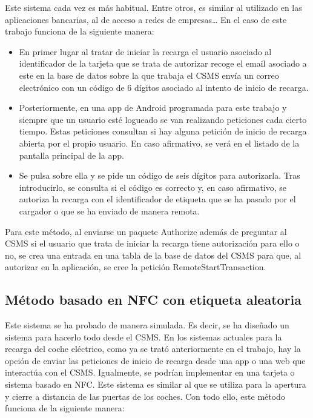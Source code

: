 \documentclass[12pt,a4paper,onecolumn,oneside]{report}
\begin{document}
Este sistema cada vez es más habitual. Entre otros, es similar al utilizado en las aplicaciones bancarias, al de acceso a redes de empresas… En el caso de este trabajo funciona de la siguiente manera:

\begin{itemize}
\item En primer lugar al tratar de iniciar la recarga el usuario asociado al identificador de la tarjeta que se trata de autorizar recoge el email asociado a este en la base de datos sobre la que trabaja el CSMS envía un correo electrónico con un código de 6 dígitos asociado al intento de inicio de recarga.
\item Posteriormente, en una app de Android programada para este trabajo y siempre que un usuario esté logueado se van realizando peticiones cada cierto tiempo. Estas peticiones consultan si hay alguna petición de inicio de recarga abierta por el propio usuario. En caso afirmativo, se verá en el listado de la pantalla principal de la app. 
\item Se pulsa sobre ella y se pide un código de seis dígitos para autorizarla. Tras introducirlo, se consulta si el código es correcto y, en caso afirmativo, se autoriza la recarga con el identificador de etiqueta que se ha pasado por el cargador o que se ha enviado de manera remota.
\end{itemize}

Para este método, al enviarse un paquete Authorize además de preguntar al CSMS si el usuario que trata de iniciar la recarga tiene autorización para ello o no, se crea una entrada en una tabla de la base de datos del CSMS para que, al autorizar en la aplicación, se cree la petición RemoteStartTransaction.


\subsection{Método basado en NFC con etiqueta aleatoria}

Este sistema se ha probado de manera simulada. Es decir, se ha diseñado un sistema para hacerlo todo desde el CSMS. En los sistemas actuales para la recarga del coche eléctrico, como ya se trató anteriormente en el trabajo, hay la opción de enviar las peticiones de inicio de recarga desde una app o una web que interactúa con el CSMS. Igualmente, se podrían implementar en una tarjeta o sistema basado en NFC. Este sistema es similar al que se utiliza para la apertura y cierre a distancia de las puertas de los coches. Con todo ello, este método funciona de la siguiente manera:
\end{document}
